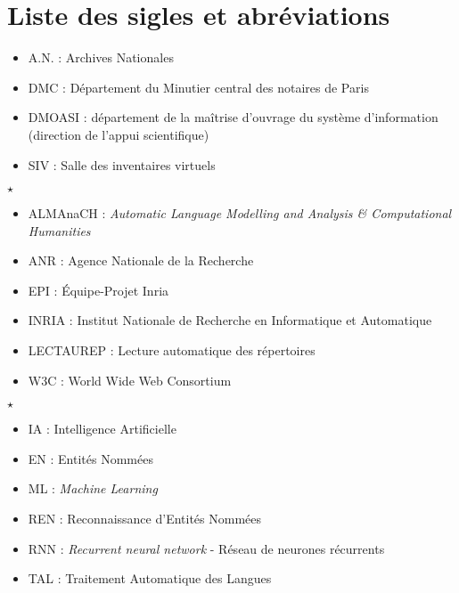 \chapter*{Liste des sigles et abréviations}

\begin{itemize}
    \item A.N. : Archives Nationales
    \item DMC : Département du Minutier central des notaires de Paris  
    \item DMOASI : département de la maîtrise d’ouvrage du système d’information (direction de l’appui scientifique) 
    \item SIV : Salle des inventaires virtuels 
\end{itemize}

\begin{center}
$\star$
\end{center} 

\begin{itemize}
    \item ALMAnaCH : \emph{Automatic Language Modelling and Analysis \& Computational Humanities}
    \item ANR : Agence Nationale de la Recherche
    \item EPI : Équipe-Projet Inria
    \item INRIA : Institut Nationale de Recherche en Informatique et Automatique
    \item LECTAUREP : Lecture automatique des répertoires
    \item W3C : World Wide Web Consortium
\end{itemize}

\begin{center}
$\star$
\end{center} 

\begin{itemize}
    \item IA : Intelligence Artificielle 
    \item EN : Entités Nommées
    \item ML : \emph{Machine Learning}
    \item REN : Reconnaissance d'Entités Nommées
    \item RNN : \emph{Recurrent neural network} - Réseau de neurones récurrents
    \item TAL : Traitement Automatique des Langues
\end{itemize}



